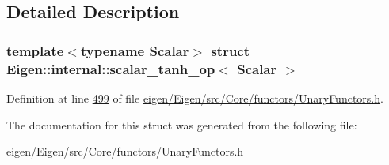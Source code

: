 \subsection{Detailed Description}
\subsubsection*{template$<$typename Scalar$>$\newline
struct Eigen\+::internal\+::scalar\+\_\+tanh\+\_\+op$<$ Scalar $>$}



Definition at line \hyperlink{eigen_2_eigen_2src_2_core_2functors_2_unary_functors_8h_source_l00499}{499} of file \hyperlink{eigen_2_eigen_2src_2_core_2functors_2_unary_functors_8h_source}{eigen/\+Eigen/src/\+Core/functors/\+Unary\+Functors.\+h}.



The documentation for this struct was generated from the following file\+:\begin{DoxyCompactItemize}
\item 
eigen/\+Eigen/src/\+Core/functors/\+Unary\+Functors.\+h\end{DoxyCompactItemize}
